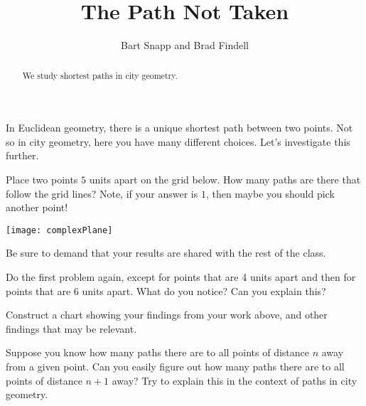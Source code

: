 \documentclass[nooutcomes]{ximera}
\title{The Path Not Taken}
\author{Bart Snapp and Brad Findell}
\begin{document}
\begin{abstract}
We study shortest paths in city geometry.
\end{abstract}
\maketitle


In Euclidean geometry, there is a unique shortest path between two
points. Not so in city geometry, here you have many different
choices. Let's investigate this further.


\begin{problem} 
Place two points $5$ units apart on the grid below. How many paths are
there that follow the grid lines? Note, if your answer is $1$, then
maybe you should pick another point!
\begin{image}
\texttt{[image: complexPlane]}
\end{image}
Be sure to demand that your results are shared with the rest of the
class.
\end{problem}

\begin{problem}
Do the first problem again, except for points that are 4 units apart
and then for points that are 6 units apart. What do you notice? Can
you explain this?
\end{problem}

\begin{problem}
Construct a chart showing your findings from your work above, and
other findings that may be relevant.
\end{problem}

\begin{problem}
Suppose you know how many paths there are to all points of distance
$n$ away from a given point. Can you easily figure out how many paths
there are to all points of distance $n+1$ away? Try to explain this in
the context of paths in city geometry.
\end{problem}
\end{document}
